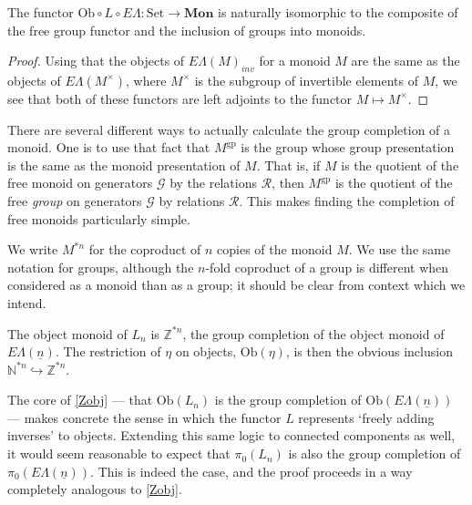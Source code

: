 \documentclass{amsbook} %
\newcommand{\mb}{\mathbf}
\newcommand{\Set}{\ensuremath{\textrm{Set}}}
\newcommand{\EL}{E\Lambda}
\newcommand{\ELn}{E\Lambda(\underline{n})}
\newcommand{\ob}{\textrm{Ob}}
\newcommand{\sets}{\Set}
\newcommand{\mon}{\ensuremath{\mb{Mon}}}
\numberwithin{section}{chapter}
\begin{document}
\begin{prop}\label{oblel_fg}
The functor $\ob \circ L \circ \EL: \sets \to \mon$ is naturally isomorphic to the composite of the free group functor and the inclusion of groups into monoids.
\end{prop}
\begin{proof}
Using that the objects of $\EL(M)_{inv}$ for a monoid $M$ are the same as the objects of $\EL(M^{\times})$, where $M^{\times}$ is the subgroup of invertible elements of $M$, we see that both of these functors are left adjoints to the functor $M \mapsto M^{\times}$.
\end{proof}
There are several different ways to actually calculate the group completion of a monoid. One is to use that fact that $M^{\mathrm{gp}}$ is the group whose group presentation is the same as the monoid presentation of $M$. That is, if $M$ is the quotient of the free monoid on generators $\mathcal{G}$ by the relations $\mathcal{R}$, then $M^{\mathrm{gp}}$ is the quotient of the free \emph{group} on generators $\mathcal{G}$ by relations $\mathcal{R}$. This makes finding the completion of free monoids particularly simple.

\begin{nota}
We write $M^{*n}$ for the coproduct of $n$ copies of the monoid $M$. We use the same notation for groups, although the $n$-fold coproduct of a group is different when considered as a monoid than as a group; it should be clear from context which we intend.
\end{nota}

\begin{cor}\label{Zobj}
The object monoid of $L_n$ is $\mathbb{Z}^{*n}$, the group completion of the object monoid of $\ELn$. The restriction of $\eta$ on objects, $\mathrm{Ob}(\eta)$, is then the obvious inclusion $\mathbb{N}^{*n} \hookrightarrow \mathbb{Z}^{*n}$.
\end{cor}





The core of \cref{Zobj} --- that $\mathrm{Ob}(L_n)$ is the group completion of $\mathrm{Ob}(\ELn)$ --- makes concrete the sense in which the functor $L$ represents `freely adding inverses' to objects. Extending this same logic to connected components as well, it would seem reasonable to expect that $\pi_0(L_n)$ is also the group completion of $\pi_0(\ELn)$. This is indeed the case, and the proof proceeds in a way completely analogous to \cref{Zobj}. 
\end{document}

